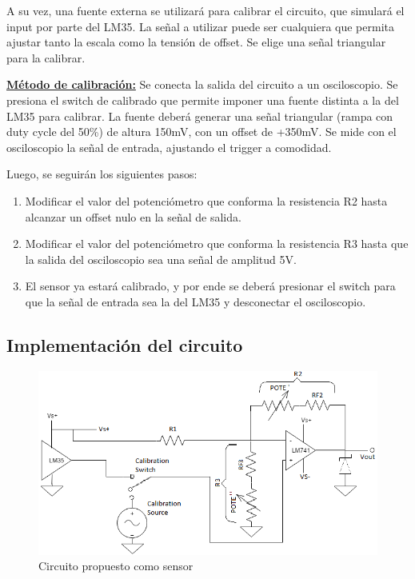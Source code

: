 \documentclass[../../main.tex]{subfiles}
\begin{document}
A su vez, una fuente externa se utilizará para calibrar el circuito, que simulará el input por parte del LM35. La señal a utilizar puede ser cualquiera que permita ajustar tanto la escala como la tensión de offset. Se elige una señal triangular para la calibrar. \par

\textbf{\underline{Método de calibración:}} 
Se conecta la salida del circuito a un osciloscopio.  
Se presiona el switch de calibrado que permite imponer una fuente distinta a la del LM35 para calibrar. La fuente deberá generar una señal triangular (rampa con duty cycle del 50\%) de altura 150mV, con un offset de +350mV. Se mide con el osciloscopio la señal de entrada, ajustando el trigger a comodidad.\par 
Luego, se seguirán los siguientes pasos:
\begin{enumerate}
	\item Modificar el valor del potenciómetro que conforma la resistencia R2 hasta alcanzar un offset nulo en la señal de salida.
	\item Modificar el valor del potenciómetro que conforma la resistencia R3 hasta que la salida del osciloscopio sea una señal de amplitud 5V.
	\item El sensor ya estará calibrado, y por ende se deberá presionar el switch para que la señal de entrada sea la del LM35 y desconectar el osciloscopio. 
\end{enumerate}

\subsection{Implementación del circuito}

\begin{figure}[H]	%
	\centering
	\includegraphics[scale=1.2]{imagenes/combinacion_circuito.png}
	\caption{Circuito propuesto como sensor}
	\label{fig:ej6_combinacion_circuito}
\end{figure}
\end{document}
